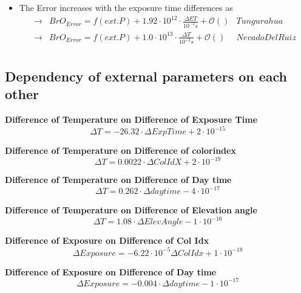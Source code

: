 \documentclass  [
  paper    = a4,
  BCOR     = 10mm,
  twoside,
  fontsize = 12pt,
  fleqn,
  toc      = bibnumbered,
  toc      = listofnumbered,
  numbers  = noendperiod,
  headings = normal,
  listof   = leveldown,
  version  = 3.03
]                                       {scrreprt}
\begin{document}
	\begin{itemize}
		\item The  Error increases with the exposure time differences as\\
		\begin{align*}
		\rightarrow&  BrO_{Error} = f(ext. P)+ 1.92\cdot10^{12}\cdot\frac{\Delta ET}{10^{-2}s} + \mathcal{O}\left(\right) & Tungurahua\\
		\rightarrow&  BrO_{Error} = f(ext. P)+ 1.0\cdot10^{13}\cdot\frac{\Delta T}{10^{-2}s} + \mathcal{O}\left(\right) & Nevado Del Ruiz\\
		\end{align*}
	\end{itemize}
	\subsection*{Dependency of external parameters on each other}
		\textbf{Difference of Temperature on  Difference of Exposure Time}
		\begin{equation}
		\Delta T =  -26.32\cdot \Delta ExpTime + 2\cdot 10^{-15}
		\end{equation}
		
		\textbf{Difference of Temperature on  Difference of colorindex}
		\begin{equation}
		\Delta T = 0.0022\cdot \Delta ColIdX +2\cdot 10^{-19}
		\end{equation}
		
				\textbf{Difference of Temperature on  Difference of Day time}
		\begin{equation}
		\Delta T =0.262\cdot \Delta daytime -4\cdot 10^{-17}
		\end{equation}
		
						\textbf{Difference of Temperature on  Difference of Elevation angle}
		\begin{equation}
		\Delta T =1.08\cdot \Delta Elev Angle -1\cdot 10^{-16}
		\end{equation}

		\textbf{Difference of Exposure on  Difference of  Col Idx}
		\begin{equation}
		\Delta Exposure  =-6.22\cdot 10^{-5} \Delta Col Idx  +1\cdot 10^{-18}
		\end{equation}
		
				\textbf{Difference of  Exposure on  Difference of Day time}
		\begin{equation}
		\Delta Exposure  =-0.004\cdot \Delta daytime -1\cdot 10^{-17}
		\end{equation}
		
\end{document}
